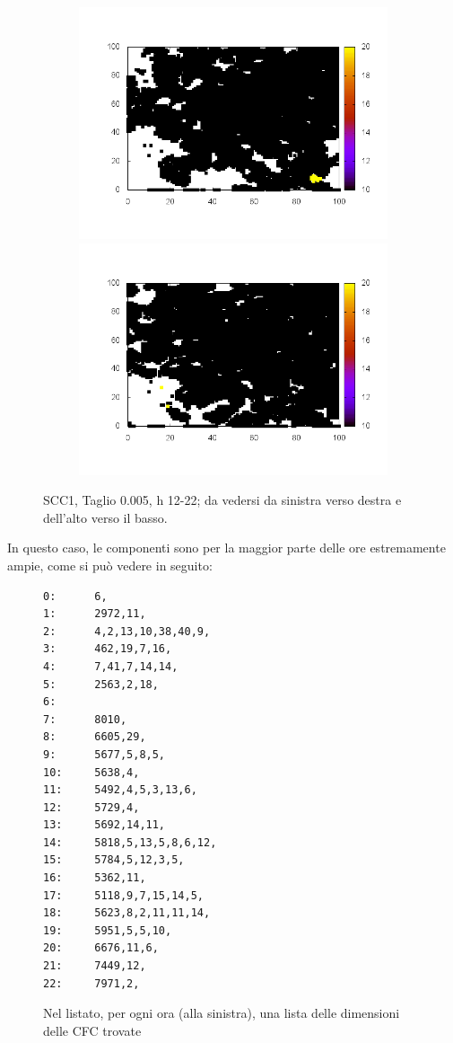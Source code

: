 \documentclass[10pt,a4paper]{article}
\begin{document}
\begin{figure}
\begin{subfigure}[b]{1\textwidth}
\end{subfigure}
\begin{subfigure}[b]{1\textwidth}
\includegraphics[scale=.3]{./img/stampe/scc1/21.png}
\includegraphics[scale=.3]{./img/stampe/scc1/22.png}
\end{subfigure}
\caption{SCC1, Taglio 0.005, h 12-22; da vedersi da sinistra verso destra e dell'alto verso il basso.}
\end{figure}
In questo caso, le componenti sono per la maggior parte delle ore estremamente ampie, come si può vedere in seguito:
\begin{figure}
\begin{verbatim}
0:      6,
1:      2972,11,
2:      4,2,13,10,38,40,9,
3:      462,19,7,16,
4:      7,41,7,14,14,
5:      2563,2,18,
6:
7:      8010,
8:      6605,29,
9:      5677,5,8,5,
10:     5638,4,
11:     5492,4,5,3,13,6,
12:     5729,4,
13:     5692,14,11,
14:     5818,5,13,5,8,6,12,
15:     5784,5,12,3,5,
16:     5362,11,
17:     5118,9,7,15,14,5,
18:     5623,8,2,11,11,14,
19:     5951,5,5,10,
20:     6676,11,6,
21:     7449,12,
22:     7971,2,
\end{verbatim}
\caption{Nel listato, per ogni ora (alla sinistra), una lista delle dimensioni delle CFC trovate}
\label{list:scc1_0-005}
\end{figure}
\end{document}
